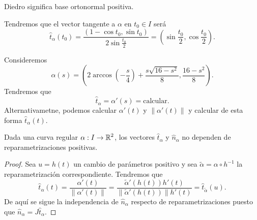 \begin{notation}
Diedro significa base ortonormal positiva. 
\end{notation}
\begin{eg}[Cicloide]
	Tendremos que el vector tangente a $\displaystyle \alpha  $ en $\displaystyle t_{0} \in I $ será
	\[\hat{t}_{\alpha }\left(t_{0}\right)=\frac{\left(1-\cos t_{0}, \sin t_{0}\right)}{2\sin \frac{t_{0}}{2}} = \left(\sin \frac{t_{0}}{2}, \cos \frac{t_{0}}{2}\right) .\]
\end{eg}
\begin{eg}
Consideremos 
\[\alpha\left(s\right)=\left(2\arccos\left(-\frac{s}{4}\right) + \frac{s\sqrt{16-s^{2}}}{8}, \frac{16-s^{2}}{8}\right) .\]
Tendremos que 
\[\hat{t}_{\alpha }= \alpha'\left(s\right)= \text{calcular} .\]
Alternativametne, podemos calcular $\displaystyle \alpha'\left(t\right) $ y $\displaystyle \|\alpha'\left(t\right)\| $ y calcular de esta forma $\displaystyle \hat{t}_{\alpha }\left(t\right) $. 
\end{eg}
\begin{lema}
Dada una curva regular $\displaystyle \alpha : I \to \mathbb{R}^{2} $, los vectores $\displaystyle \hat{t}_{\alpha } $ y $\displaystyle \hat{n}_{\alpha } $ no dependen de reparametrizaciones positivas.
\end{lema}
\begin{proof}
	Sea $\displaystyle u = h\left(t\right) $ un cambio de parámetros positivo y sea $\displaystyle \tilde{\alpha} = \alpha \circ h^{-1} $ la reparametrización correspondiente. Tendremos que 
	\[\hat{t}_{\alpha }\left(t\right)=\frac{\alpha'\left(t\right)}{\|\alpha'\left(t\right)\|}=\frac{\tilde{\alpha}'\left(h\left(t\right)\right) h'\left(t\right)}{\|\tilde{\alpha}'\left(h\left(t\right)\right) \|h'\left(t\right)} = \hat{t}_{\tilde{\alpha}}\left(u\right) .\]
	De aquí se sigue la independencia de $\displaystyle \hat{n}_{\alpha } $ respecto de reparametrizaciones puesto que $\displaystyle \hat{n}_{\alpha } = J\hat{t}_{\alpha } $. 
\end{proof}

